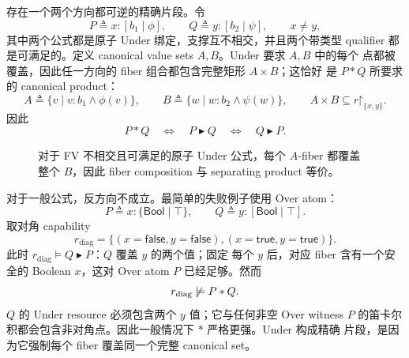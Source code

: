 \documentclass[10pt]{ctexart}
\newcommand{\Bool}{\mathsf{Bool}}
\newcommand{\false}{\mathsf{false}}
\newcommand{\true}{\mathsf{true}}
\newcommand{\restr}{\mathord{\upharpoonright}}
\newcommand{\rfcomp}{\mathbin{\blacktriangleright}}
\newcommand{\modelsr}{\mathrel{\models}}
\begin{document}
存在一个两个方向都可逆的精确片段。令
\[
  P\triangleq x:[b_1\mid\phi],
  \qquad
  Q\triangleq y:[b_2\mid\psi],
  \qquad x\neq y,
\]
其中两个公式都是原子 Under 绑定，支撑互不相交，并且两个带类型 qualifier
都是可满足的。定义 canonical value sets $A,B$。Under 要求 $A,B$ 中的每个
点都被覆盖，因此任一方向的 fiber 组合都包含完整矩形 $A\times B$；这恰好
是 $P*Q$ 所要求的 canonical product：
\[
  A\triangleq\{v\mid v:b_1\land\phi(v)\},
  \qquad
  B\triangleq\{w\mid w:b_2\land\psi(w)\},
  \qquad
  A\times B\subseteq r\restr_{\{x,y\}}.
\]
因此
\begin{equation}\label{eq:under-equivalence}
  P*Q
  \quad\Longleftrightarrow\quad
  P\rfcomp Q
  \quad\Longleftrightarrow\quad
  Q\rfcomp P.
\end{equation}

\begin{figure}[H]
\centering
{}
\caption{对于 FV 不相交且可满足的原子 Under 公式，每个 $A$-fiber 都覆盖
整个 $B$，因此 fiber composition 与 separating product 等价。}
\label{fig:under-rectangle}
\end{figure}

对于一般公式，反方向不成立。最简单的失败例子使用 Over atom：
\[
  P\triangleq x:\{\Bool\mid\top\},
  \qquad
  Q\triangleq y:[\Bool\mid\top].
\]
取对角 capability
\[
  r_{\mathrm{diag}}
  =\{(x=\false,y=\false),(x=\true,y=\true)\}.
\]
此时 $r_{\mathrm{diag}}\modelsr Q\rfcomp P$：$Q$ 覆盖 $y$ 的两个值；固定
每个 $y$ 后，对应 fiber 含有一个安全的 Boolean $x$，这对 Over atom $P$
已经足够。然而
\[
  r_{\mathrm{diag}}\not\modelsr P*Q.
\]
$Q$ 的 Under resource 必须包含两个 $y$ 值；它与任何非空 Over witness $P$
的笛卡尔积都会包含非对角点。因此一般情况下 $*$ 严格更强。Under 构成精确
片段，是因为它强制每个 fiber 覆盖同一个完整 canonical set。
\end{document}
